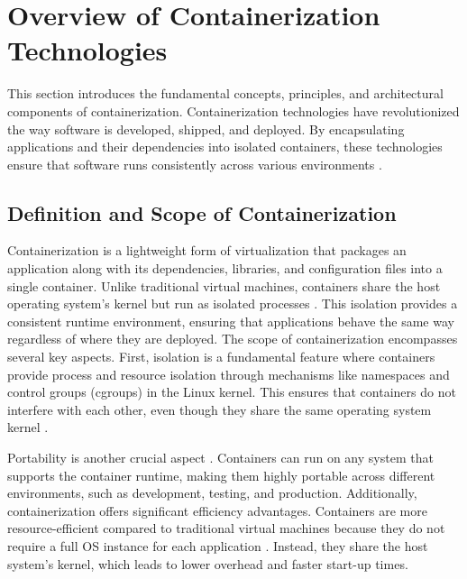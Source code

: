 \section{Overview of Containerization Technologies}

This section introduces the fundamental concepts, principles, and architectural
components of containerization. Containerization technologies have revolutionized
the way software is developed, shipped, and deployed. By encapsulating applications
and their dependencies into isolated containers, these technologies ensure that
software runs consistently across various environments \cite[Under the Hood]
{merkelDockerLightweightLinux2014}.

\subsection{Definition and Scope of Containerization}

Containerization is a lightweight form of virtualization \cite[Containers vs. Other
	Types of Virtualization]{merkelDockerLightweightLinux2014} that packages an
application along with its dependencies, libraries, and configuration files into a
single container. Unlike traditional virtual machines, containers share the host
operating system's kernel but run as isolated processes \cite[Containers vs. Other
	Types of Virtualization]{merkelDockerLightweightLinux2014}. This isolation provides
a consistent runtime environment, ensuring that applications behave the same way
regardless of where they are deployed.
The scope of containerization encompasses several key aspects. First, isolation is
a fundamental feature where containers provide process and resource isolation
through mechanisms like namespaces \cite[Under the Hood]{merkelDockerLightweightLinux2014}
and control groups (cgroups) \cite[Under the Hood]{merkelDockerLightweightLinux2014}
in the Linux kernel. This ensures that containers do not interfere with each other,
even though they share the same operating system kernel \cite{OperatingSystem2024}.

Portability is another crucial aspect \cite{SoftwarePortability2024}. Containers can
run on any system that supports the container runtime, making them highly portable
across different environments, such as development, testing, and production.
Additionally, containerization offers significant efficiency advantages. Containers
are more resource-efficient compared to traditional virtual machines because they
do not require a full OS instance for each application \cite[Under the Hood]
{merkelDockerLightweightLinux2014}. Instead, they share the host system's kernel,
which leads to lower overhead and faster start-up times.

